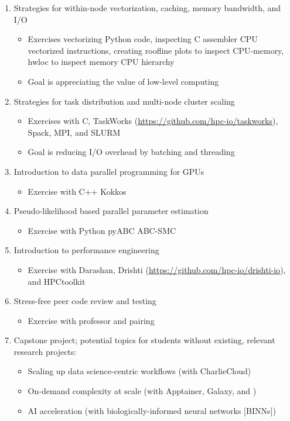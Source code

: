 \documentclass[12pt]{article}
\begin{document}
\begin{enumerate}
\item Strategies for within-node vectorization, caching, memory bandwidth, and
  I/O
  \begin{itemize}
  \item Exercises vectorizing Python code, inspecting C assembler CPU
    vectorized instructions, creating roofline plots to inspect CPU-memory,
    hwloc to inspect memory CPU hierarchy
  \item Goal is appreciating the value of low-level computing
  \end{itemize}
\item Strategies for task distribution and multi-node cluster scaling
  \begin{itemize}
  \item Exercises with C, TaskWorks
    (\url{https://github.com/hpc-io/taskworks}), Spack, MPI, and SLURM
  \item Goal is reducing I/O overhead by batching and threading
  \end{itemize}
\item Introduction to data parallel programming for GPUs
  \begin{itemize}
  \item Exercise with C++ Kokkos
  \end{itemize}
\item Pseudo-likelihood based parallel parameter estimation
  \begin{itemize}
  \item Exercise with Python pyABC ABC-SMC
  \end{itemize}
\item Introduction to performance engineering
  \begin{itemize}
  \item Exercise with Darashan, Drishti
    (\url{https://github.com/hpc-io/drishti-io}), and HPCtoolkit
  \end{itemize}
\item Stress-free peer code review and testing
  \begin{itemize}
  \item Exercise with professor and pairing
  \end{itemize}
\item Capstone project; potential topics for students without existing,
  relevant research projects:
  \begin{itemize}
  \item Scaling up data science-centric workflows (with CharlieCloud)
  \item On-demand complexity at scale (with Apptainer, Galaxy, and )
  \item AI acceleration (with biologically-informed neural networks [BINNs])
  \end{itemize}
\end{enumerate}
\end{document}
